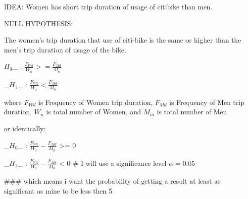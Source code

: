 IDEA:
Women has short trip duration of usage of citibike than men.

NULL HYPOTHESIS:

The women's trip duration that use of citi-bike is the same or higher than the men's trip duration of usage of the bike.

$H_0$_ : $\frac{F_{Wd}}{W_{n}} >= \frac{F_{Md}}{M_{n}} $ 

_$H_1$_ : $\frac{F_{Wd}}{W_{n}} < \frac{F_{Md}}{M_{n}} $

where $F_{Wd}$ is Frequency of Women trip duration, $F_{Md}$ is Frequency of Men trip duration, ${W_{n}}$ is total number of Women, and ${M_{m}}$ is total number of Men

or identically:

_$H_0$_ : $\frac{F_{Wd}}{W_{n}} - \frac{F_{Md}}{M_{n}} $ >= 0

_$H_1$_ : $\frac{F_{Wd}}{W_{n}} - \frac{F_{Md}}{M_{n}} $ < 0
# I will use a significance level  $\alpha=0.05$

### which means i want the probability of getting a result at least as significant as mine to be less then 5%